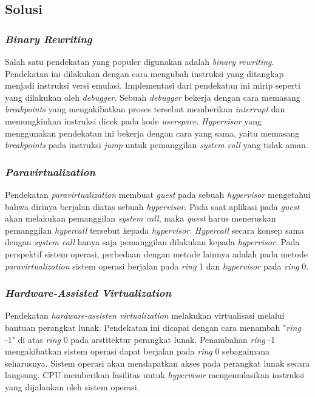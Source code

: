 \subsection{Solusi}

\subsubsection{\textit{Binary Rewriting}}

Salah satu pendekatan yang populer digunakan adalah \textit{binary rewriting}. Pendekatan ini dilakukan dengan cara
mengubah instruksi yang ditangkap menjadi instruksi versi emulasi. Implementasi dari pendekatan ini mirip seperti yang
dilakukan oleh \textit{debugger}. Sebuah \textit{debugger} bekerja dengan cara memasang \textit{breakpoints} yang
mengakibatkan proses tersebut memberikan \textit{interrupt} dan memungkinkan instruksi dicek pada kode
\textit{userspace}. \textit{Hypervisor} yang menggunakan pendekatan ini bekerja dengan cara yang sama, yaitu memasang
\textit{breakpoints} pada instruksi \textit{jump} untuk pemanggilan \textit{system call} yang tidak aman.

\subsubsection{\textit{Paravirtualization}}

Pendekatan \textit{paravirtualization} membuat \textit{guest} pada sebuah \textit{hypervisor} mengetahui bahwa dirinya
berjalan diatas sebuah \textit{hypervisor}. Pada saat aplikasi pada \textit{guest} akan melakukan pemanggilan
\textit{system call}, maka \textit{guest} harus meneruskan pemanggilan \textit{hypercall} tersebut kepada
\textit{hypervisor}. \textit{Hypercall} secara konsep sama dengan \textit{system call} hanya saja pemanggilan dilakukan
kepada \textit{hypervisor}. Pada perspektif sistem operasi, perbedaan dengan metode lainnya adalah pada metode
\textit{paravirtualization} sistem operasi berjalan pada \textit{ring} 1 dan \textit{hypervisor} pada \textit{ring}
0.

\subsubsection{\textit{Hardware-Assisted Virtualization}}

Pendekatan \textit{hardware-assisten virtualization} melakukan virtualisasi melalui bantuan perangkat lunak. Pendekatan
ini dicapai dengan cara menambah "\textit{ring} -1" di atas \textit{ring} 0 pada arstitektur perangkat lunak. Penambahan
\textit{ring} -1 mengakibatkan sistem operasi dapat berjalan pada \textit{ring} 0 sebagaimana seharusnya. Sistem operasi
akan mendapatkan akses pada perangkat lunak secara langsung. CPU memberikan fasilitas untuk \textit{hypervisor}
mengemulasikan instruksi yang dijalankan oleh sistem operasi.

